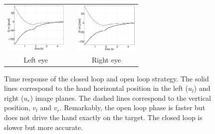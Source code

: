   \begin{figure}
  \begin{center}
	\begin{tabular}{ccc}
	  \parbox{30mm}{\includegraphics[width=30mm]{Figure/LeftEyeOpenClosedLoopTimeResponse.eps}}  & \hspace{.1cm} &
	  \parbox{30mm}{\includegraphics[width=30mm]{Figure/RightEyeOpenClosedLoopTimeResponse.eps}}
	  \\
	  \parbox{30mm}{\centering Left eye } & \hspace{.1cm} & \parbox{50mm}{\centering Right eye }
  \end{tabular}
\end{center}
\caption{Time response of the closed loop and open loop strategy. The solid lines correspond to the hand horizontal position in the left ($u_l$) and right ($u_r$) image planes. The dashed lines correspond to the vertical position, $v_l$ and $v_r$. Remarkably, the open loop phase is faster but does not drive the hand exactly on the target. The closed loop is slower but more accurate.}\label{Fig:TimeResponseOpenClosedLoop}
  \end{figure}